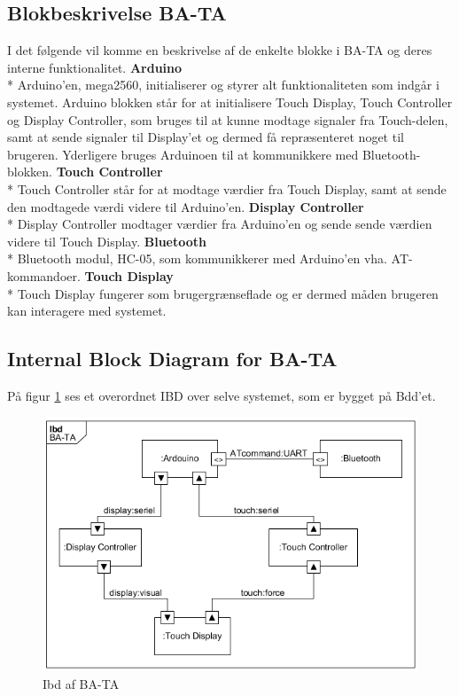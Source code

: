 \subsection{Blokbeskrivelse BA-TA}
I det følgende vil komme en beskrivelse af de enkelte blokke i BA-TA og deres interne funktionalitet.
\newline
\newline
\textbf{Arduino} \\*
Arduino'en, mega2560, initialiserer og styrer alt funktionaliteten som indgår i systemet. Arduino blokken står for at initialisere  Touch Display, Touch Controller og Display Controller, som bruges til at kunne modtage signaler fra Touch-delen, samt at sende signaler til Display'et og dermed få repræsenteret noget til brugeren. Yderligere bruges Arduinoen til at kommunikkere med Bluetooth-blokken.
\newline
\newline
\textbf{Touch Controller} \\*
Touch Controller står for at modtage værdier fra Touch Display, samt at sende den modtagede værdi videre til Arduino'en. 
\newline
\newline
\textbf{Display Controller} \\*
Display Controller modtager værdier fra Arduino'en og sende sende værdien videre til Touch Display. \newline
\newline
\textbf{Bluetooth} \\*
Bluetooth modul, HC-05, som kommunikkerer med Arduino'en vha. AT-kommandoer.
\newline
\newline
\textbf{Touch Display} \\*
Touch Display fungerer som brugergrænseflade og er dermed måden brugeren kan interagere med systemet. 
\subsection{Internal Block Diagram for BA-TA}
På figur \ref{fig:Ibd} ses et overordnet IBD over selve systemet, som er bygget på Bdd'et. 
\begin{figure}[H]
	\centering
	\includegraphics[width = 300 pt]{Img/Ibd.png}
	\caption{Ibd af BA-TA}
	\label{fig:Ibd}
\end{figure}




